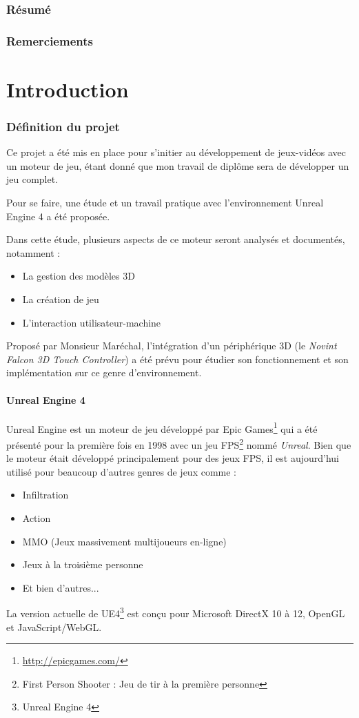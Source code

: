 \documentclass[11pt, a4paper, oneside]{article}
\begin{document}
\section{Résumé}
\section{Remerciements}
\newpage
\tableofcontents
\newpage
\part{Introduction}
\section{Définition du projet}
Ce projet a été mis en place pour s'initier au développement de jeux-vidéos avec un moteur de jeu, étant donné que mon travail de diplôme sera de développer un jeu complet.

Pour se faire, une étude et un travail pratique avec l'environnement Unreal Engine 4 a été proposée.

Dans cette étude, plusieurs aspects de ce moteur seront analysés et documentés, notamment :
\begin{itemize}
\item La gestion des modèles 3D
\item La création de jeu
\item L'interaction utilisateur-machine\\
\end{itemize}
Proposé par Monsieur Maréchal, l'intégration d'un périphérique 3D (le \textit{Novint Falcon 3D Touch Controller}) a été prévu pour étudier son fonctionnement et son implémentation sur ce genre d'environnement.
\subsection{Unreal Engine 4}
\label{sec:ue4definition}
Unreal Engine est un moteur de jeu développé par Epic Games\footnote{\url{http://epicgames.com/}} qui a été présenté pour la première fois en 1998 avec un jeu FPS\footnote{First Person Shooter : Jeu de tir à la première personne} nommé \textit{Unreal}. Bien que le moteur était développé principalement pour des jeux FPS, il est aujourd'hui utilisé pour beaucoup d'autres genres de jeux comme :
\begin{itemize}
\item Infiltration
\item Action
\item MMO (Jeux massivement multijoueurs en-ligne)
\item Jeux à la troisième personne
\item Et bien d'autres...
\end{itemize}
La version actuelle de UE4\footnote{Unreal Engine 4} est conçu pour Microsoft DirectX 10 à 12, OpenGL et JavaScript/WebGL.
\newpage
\end{document}
